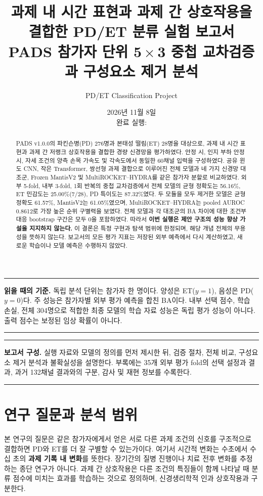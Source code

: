 \documentclass[11pt,a4paper]{article}
\title{\color{navy}\bfseries 과제 내 시간 표현과 과제 간 상호작용을\\[.25em]
 결합한 PD/ET 분류 실험 보고서\\[.6em]
 \large PADS 참가자 단위 5\,$\times$\,3 중첩 교차검증과 구성요소 제거 분석}
\author{PD/ET Classification Project}
\date{2026년 11월 8일\\[.25em]\small 완료 실행: \code{@@RUN_ID@@}}
\numberwithin{equation}{section}
\newenvironment{keybox}{\begin{center}\begin{minipage}{.94\linewidth}\color{navy}\hrule\vspace{.6em}\small}
 {\vspace{.5em}\hrule\end{minipage}\end{center}}
\begin{document}
\maketitle\thispagestyle{empty}
\begin{abstract}
PADS v1.0.0의 파킨슨병(PD) 276명과 본태성 떨림(ET) 28명을 대상으로,
과제 내 시간 표현과 과제 간 저랭크 상호작용을 결합한 경량 신경망을 평가하였다.
안정 시, 인지 부하 안정 시, 자세 조건의 양측 손목 가속도 및 각속도에서
동일한 60채널 입력을 구성하였다. 공유 윈도 CNN, 작은 Transformer,
쌍선형 과제 결합으로 이루어진 전체 모델과 네 가지 신경망 대조군,
Frozen MantisV2 및 MultiROCKET--HYDRA를 같은 참가자 분할로 비교하였다.
외부 5-fold, 내부 3-fold, 1회 반복의 중첩 교차검증에서 전체 모델의
균형 정확도는 56.16\%, ET 민감도는 25.00\%(7/28), PD 특이도는 87.32\%였다.
두 모듈을 모두 제거한 모델은 균형 정확도 61.57\%, MantisV2는 61.05\%였으며,
MultiROCKET--HYDRA는 pooled AUROC 0.8612로 가장 높은 순위 구별력을 보였다.
전체 모델과 각 대조군의 BA 차이에 대한 조건부 대응 bootstrap 구간은 모두 0을 포함하였다.
따라서 \textbf{이번 실행은 제안 구조의 성능 향상 가설을 지지하지 않는다.}
이 결론은 특정 구현과 탐색 범위에 한정되며, 해당 개념 전체의 무용성을 뜻하지 않는다.
보고서의 모든 평가 지표는 저장된 외부 예측에서 다시 계산하였고,
새로운 학습이나 모델 예측은 수행하지 않았다.
\end{abstract}

\begin{keybox}
\textbf{읽을 때의 기준.}
독립 분석 단위는 참가자 한 명이다. 양성은 ET($y=1$), 음성은 PD($y=0$)다.
주 성능은 참가자별 외부 평가 예측을 합친 BA이다.
내부 선택 점수, 학습 손실, 전체 304명으로 적합한 최종 모델의 학습 자료 성능은
독립 평가 성능이 아니다. 출력 점수는 보정된 임상 확률이 아니다.
\end{keybox}
\clearpage
\tableofcontents
\vfill
\begin{keybox}
\textbf{보고서 구성.}
실행 자료와 모델의 정의를 먼저 제시한 뒤, 검증 절차, 전체 비교,
구성요소 제거 분석과 불확실성을 설명한다. 부록에는 35개 외부 평가 fold의
선택 설정과 결과, 과거 132채널 결과와의 구분, 감사 및 재현 정보를 수록한다.
\end{keybox}
\clearpage

\section{연구 질문과 분석 범위}

본 연구의 질문은 같은 참가자에게서 얻은 서로 다른 과제 조건의 신호를
구조적으로 결합하면 PD와 ET를 더 잘 구별할 수 있는가이다.
여기서 시간적 변화는 수초에서 수십 초의 \textbf{과제 기록 내 변화}를 뜻한다.
장기간의 질병 진행이나 치료 전후 변화를 추정하는 종단 연구가 아니다.
과제 간 상호작용은 다른 조건의 특징들이 함께 나타날 때 분류 점수에 미치는
효과를 학습하는 것으로 정의하며, 신경생리학적 인과 상호작용과 구분한다.
\end{document}

